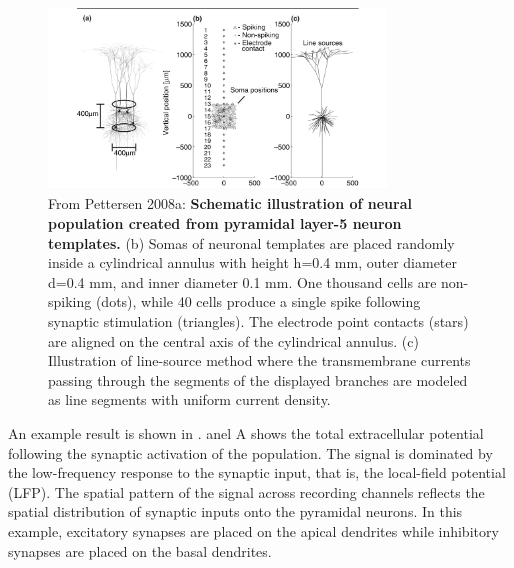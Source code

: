 \begin{figure}[!ht]
\begin{center}
\includegraphics[width=0.8\textwidth]{Figures/Spikes/MUA-2}
\end{center}
\caption[]{
From Pettersen 2008a: \textbf{Schematic illustration of neural population created from pyramidal layer-5 neuron templates.} (b) Somas of neuronal templates are placed randomly inside a cylindrical annulus with height h=0.4 mm, outer diameter d=0.4 mm, and inner diameter 0.1 mm. One thousand cells are non-spiking (dots), while 40 cells produce a single spike following synaptic stimulation (triangles). The electrode point contacts (stars) are aligned on the central axis of the cylindrical annulus. (c) Illustration of line-source method where the transmembrane currents passing through the 
segments of the displayed branches are modeled as line segments with uniform current density.}
\label{fig:Spikes:MUA-population}
\end{figure}

An example result is shown in . 
anel A shows the total extracellular potential following the synaptic activation of the population. 
The signal is dominated by the low-frequency response to the synaptic input, 
that is, the local-field potential (LFP). 
The spatial pattern of the signal across recording channels reflects the
spatial distribution of synaptic inputs onto the pyramidal neurons. 
In this example, excitatory synapses are placed on the apical dendrites 
while inhibitory synapses are placed on the basal dendrites. 

